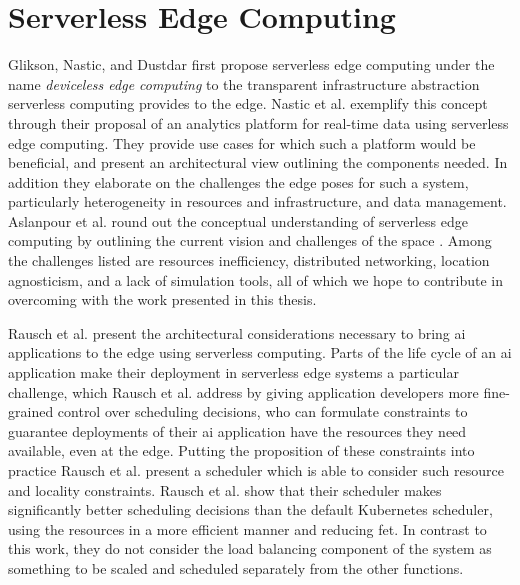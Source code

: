 \section{Serverless Edge Computing}
Glikson, Nastic, and Dustdar first propose serverless edge computing under the name \textit{deviceless edge computing} to the transparent infrastructure abstraction serverless computing provides to the edge\cite{gliksonDevicelessEdgeComputing2017}.
Nastic et al. exemplify this concept through their proposal of an analytics platform for real-time data using serverless edge computing\cite{nasticServerlessRealTimeData2017}.
They provide use cases for which such a platform would be beneficial, and present an architectural view outlining the components needed.
In addition they elaborate on the challenges the edge poses for such a system, particularly heterogeneity in resources and infrastructure, and data management\cite{nasticServerlessRealTimeData2017}.
Aslanpour et al. round out the conceptual understanding of serverless edge computing by outlining the current vision and challenges of the space \cite{aslanpourServerlessEdgeComputing2021}.
Among the challenges listed are resources inefficiency, distributed networking, location agnosticism, and a lack of simulation tools\cite{aslanpourServerlessEdgeComputing2021}, all of which we hope to contribute in overcoming with the work presented in this thesis.

Rausch et al.\cite{rauschServerlessPlatformEdge} present the architectural considerations necessary to bring \gls{ai} applications to the edge using serverless computing.
Parts of the life cycle of an \gls{ai} application make their deployment in serverless edge systems a particular challenge\cite{aslanpourServerlessEdgeComputing2021}, which Rausch et al. address by giving application developers more fine-grained control over scheduling decisions\cite{rauschServerlessPlatformEdge}, who can formulate constraints to guarantee deployments of their \gls{ai} application have the resources they need available, even at the edge.
Putting the proposition of these constraints into practice Rausch et al. present a scheduler which is able to consider such resource and locality constraints\cite{skippy}.
Rausch et al. show that their scheduler makes significantly better scheduling decisions than the default Kubernetes scheduler, using the resources in a more efficient manner and reducing \gls{fet}\cite{skippy}. In contrast to this work, they do not consider the load balancing component of the system as something to be scaled and scheduled separately from the other functions.


